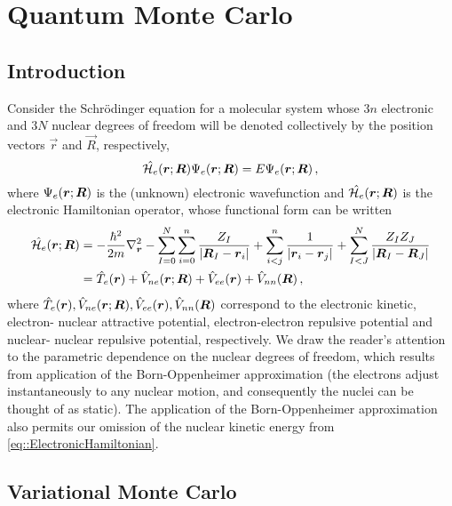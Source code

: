 \section{Quantum Monte Carlo}
\subsection{Introduction}
Consider the Schr\"{o}dinger equation for a molecular system whose $3n$ electronic
and $3N$ nuclear degrees of freedom will be denoted collectively by the position
vectors $\vec{r}$ and $\vec{R}$, respectively,
%
\begin{equation}\label{eq::ElectronicSchrodinger}
  \hat{\mathcal{H}_e}(\boldsymbol{r};\boldsymbol{R})\Psi_e(\boldsymbol{r};\boldsymbol{R}) = E\Psi_e(\boldsymbol{r};\boldsymbol{R}) \,,
\end{equation}
%
where $\Psi_e(\boldsymbol{r};\boldsymbol{R})$ is the (unknown) electronic wavefunction and $\hat{\mathcal{H}_e}(\boldsymbol{r};\boldsymbol{R})$ is the
electronic Hamiltonian operator, whose functional form can be written
%
\begin{align}\label{eq::ElectronicHamiltonian}
  \hat{\mathcal{H}_e}(\boldsymbol{r};\boldsymbol{R}) &=
  - \frac{\hbar^2}{2m}\nabla^2_{\boldsymbol{r}}
  - \sum_{I=0}^N\sum_{i=0}^n \frac{Z_I}{|\boldsymbol{R}_I - \boldsymbol{r}_i|}
  + \sum_{i<j}^n \frac{1}{|\boldsymbol{r}_i - \boldsymbol{r}_j|}
  + \sum_{I<J}^N \frac{Z_IZ_J}{|\boldsymbol{R}_I - \boldsymbol{R}_J|} \nonumber \\
  &= \hat{T}_e(\boldsymbol{r}) + \hat{V}_{ne}(\boldsymbol{r};\boldsymbol{R}) + \hat{V}_{ee}(\boldsymbol{r}) + \hat{V}_{nn}(\boldsymbol{R}) \,,
\end{align}
%
where $\hat{T}_e(\boldsymbol{r}), \hat{V}_{ne}(\boldsymbol{r};\boldsymbol{R}), \hat{V}_{ee}(\boldsymbol{r}), \hat{V}_{nn}(\boldsymbol{R})$ correspond to the electronic kinetic, electron-
nuclear attractive potential, electron-electron repulsive potential and nuclear-
nuclear repulsive potential, respectively.
We draw the reader's attention to the parametric dependence on the nuclear
degrees of freedom, which results from application of the Born-Oppenheimer
approximation (the electrons adjust instantaneously to any nuclear motion, and
consequently the nuclei can be thought of as static). The application of the
Born-Oppenheimer approximation also permits our omission of the nuclear kinetic
energy from \eqref{eq::ElectronicHamiltonian}.

\subsection{Variational Monte Carlo}

